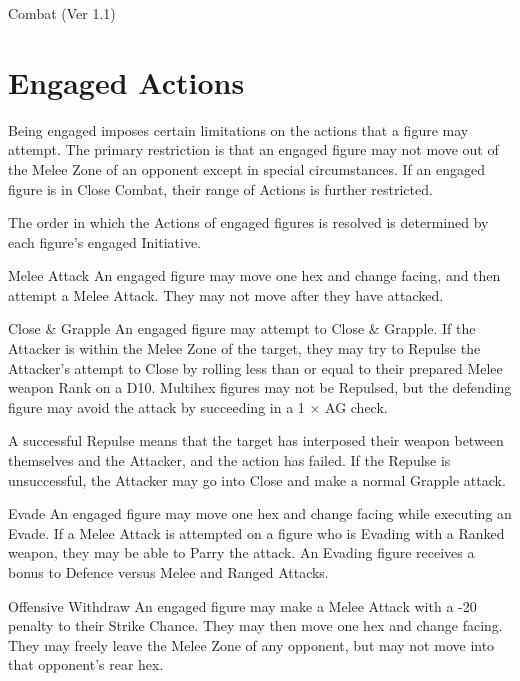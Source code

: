 \begin{Chapter}{Combat (Ver 1.1)}
\begin{Description}
\end{Description}

\section{Engaged Actions}
\label{combat:engaged}

Being engaged imposes certain limitations on the actions that a figure
may attempt.  The primary restriction is that an engaged figure may
not move out of the Melee Zone of an opponent except in special
circumstances.  If an engaged figure is in Close Combat, their range
of Actions is further restricted.

The order in which the Actions of engaged figures is resolved is
determined by each figure’s engaged Initiative.

\begin{Description}

\item[Melee Attack] An engaged figure may move one hex and change
  facing, and then attempt a Melee Attack. They may not move after
  they have attacked.

\item[Close \& Grapple] An engaged figure may attempt to Close \&
  Grapple. If the Attacker is within the Melee Zone of the target,
  they may try to Repulse the Attacker’s attempt to Close by rolling
  less than or equal to their prepared Melee weapon Rank on a D10.
  Multihex figures may not be Repulsed, but the defending figure may
  avoid the attack by succeeding in a 1 × AG check.

  A successful Repulse means that the target has interposed their
  weapon between themselves and the Attacker, and the action has
  failed.  If the Repulse is unsuccessful, the Attacker may go into
  Close and make a normal Grapple attack.

\item[Evade] An engaged figure may move one hex and change facing
  while executing an Evade. If a Melee Attack is attempted on a figure
  who is Evading with a Ranked weapon, they may be able to Parry the
  attack.  An Evading figure receives a bonus to Defence versus Melee
  and Ranged Attacks.

\item[Offensive Withdraw] An engaged figure may make a Melee Attack
  with a -20 penalty to their Strike Chance.  They may then move one
  hex and change facing.  They may freely leave the Melee Zone of any
  opponent, but may not move into that opponent’s rear hex.


\end{Description}
\end{Chapter}
